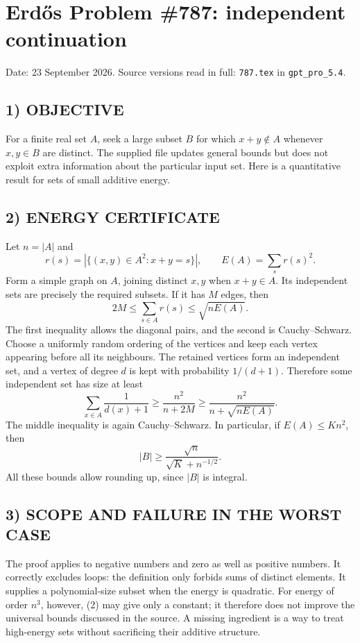 \section{Erd\H{o}s Problem \#787: independent continuation}
\noindent Date: 23 September 2026. Source versions read in full: \texttt{787.tex} in \texttt{gpt\_pro\_5.4}.

\subsection*{1) OBJECTIVE}
For a finite real set $A$, seek a large subset $B$ for which $x+y\notin A$ whenever $x,y\in B$ are distinct. The supplied file updates general bounds but does not exploit extra information about the particular input set. Here is a quantitative result for sets of small additive energy.
\subsection*{2) ENERGY CERTIFICATE}
Let $n=|A|$ and
\[
r(s)=|\{(x,y)\in A^2:x+y=s\}|,\qquad E(A)=\sum_s r(s)^2.
\]
Form a simple graph on $A$, joining distinct $x,y$ when $x+y\in A$. Its independent sets are precisely the required subsets. If it has $M$ edges, then
\[
2M\le\sum_{s\in A}r(s)\le\sqrt{nE(A)}. \tag{1}
\]
The first inequality allows the diagonal pairs, and the second is Cauchy--Schwarz.
Choose a uniformly random ordering of the vertices and keep each vertex appearing before all its neighbours. The retained vertices form an independent set, and a vertex of degree $d$ is kept with probability $1/(d+1)$. Therefore some independent set has size at least
\[
\sum_{x\in A}\frac1{d(x)+1}\ge\frac{n^2}{n+2M}
\ge\boxed{\frac{n^2}{n+\sqrt{nE(A)}}}. \tag{2}
\]
The middle inequality is again Cauchy--Schwarz. In particular, if $E(A)\le K n^2$, then
\[
|B|\ge\frac{\sqrt n}{\sqrt K+n^{-1/2}}.
\]
All these bounds allow rounding up, since $|B|$ is integral.
\subsection*{3) SCOPE AND FAILURE IN THE WORST CASE}
The proof applies to negative numbers and zero as well as positive numbers. It correctly excludes loops: the definition only forbids sums of distinct elements. It supplies a polynomial-size subset when the energy is quadratic. For energy of order $n^3$, however, (2) may give only a constant; it therefore does not improve the universal bounds discussed in the source. A missing ingredient is a way to treat high-energy sets without sacrificing their additive structure.
